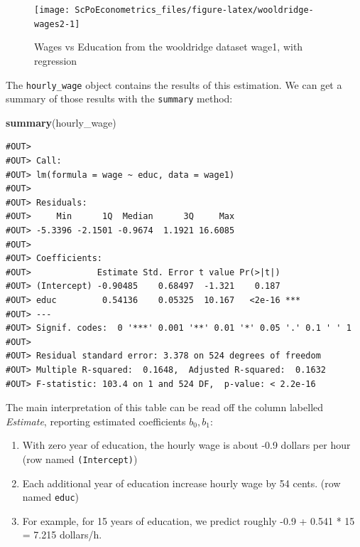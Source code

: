\documentclass[]{book}
\newenvironment{Shaded}{\begin{snugshade}}{\end{snugshade}}
\newcommand{\KeywordTok}[1]{\textcolor[rgb]{0.13,0.29,0.53}{\textbf{#1}}}
\newcommand{\NormalTok}[1]{#1}
\providecommand{\tightlist}{%
  \setlength{\itemsep}{0pt}\setlength{\parskip}{0pt}}
\begin{document}
\begin{figure}

{\centering \texttt{[image: ScPoEconometrics\_files/figure-latex/wooldridge-wages2-1]} 

}

\caption{Wages vs Education from the wooldridge dataset wage1, with regression}\label{fig:wooldridge-wages2}
\end{figure}

The \texttt{hourly\_wage} object contains the results of this estimation. We can get a summary of those results with the \texttt{summary} method:

\begin{Shaded}
\begin{Highlighting}[]
\KeywordTok{summary}\NormalTok{(hourly_wage)}
\end{Highlighting}
\end{Shaded}

\begin{verbatim}
#OUT> 
#OUT> Call:
#OUT> lm(formula = wage ~ educ, data = wage1)
#OUT> 
#OUT> Residuals:
#OUT>     Min      1Q  Median      3Q     Max 
#OUT> -5.3396 -2.1501 -0.9674  1.1921 16.6085 
#OUT> 
#OUT> Coefficients:
#OUT>             Estimate Std. Error t value Pr(>|t|)    
#OUT> (Intercept) -0.90485    0.68497  -1.321    0.187    
#OUT> educ         0.54136    0.05325  10.167   <2e-16 ***
#OUT> ---
#OUT> Signif. codes:  0 '***' 0.001 '**' 0.01 '*' 0.05 '.' 0.1 ' ' 1
#OUT> 
#OUT> Residual standard error: 3.378 on 524 degrees of freedom
#OUT> Multiple R-squared:  0.1648,	Adjusted R-squared:  0.1632 
#OUT> F-statistic: 103.4 on 1 and 524 DF,  p-value: < 2.2e-16
\end{verbatim}

The main interpretation of this table can be read off the column labelled \emph{Estimate}, reporting estimated coefficients \(b_0,b_1\):

\begin{enumerate}
\def\labelenumi{\arabic{enumi}.}
\tightlist
\item
  With zero year of education, the hourly wage is about -0.9 dollars per hour (row named \texttt{(Intercept)})
\item
  Each additional year of education increase hourly wage by 54 cents. (row named \texttt{educ})
\item
  For example, for 15 years of education, we predict roughly -0.9 + 0.541 * 15 = 7.215 dollars/h.
\end{enumerate}
\end{document}
